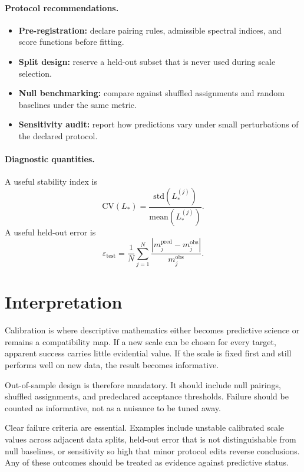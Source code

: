 \documentclass[11pt]{article}
\begin{document}
\paragraph{Protocol recommendations.}
\begin{itemize}[leftmargin=*]
\item \textbf{Pre-registration:} declare pairing rules, admissible spectral indices, and score functions before fitting.
\item \textbf{Split design:} reserve a held-out subset that is never used during scale selection.
\item \textbf{Null benchmarking:} compare against shuffled assignments and random baselines under the same metric.
\item \textbf{Sensitivity audit:} report how predictions vary under small perturbations of the declared protocol.
\end{itemize}

\paragraph{Diagnostic quantities.}
A useful stability index is
\[
\mathrm{CV}(L_*)=\frac{\mathrm{std}(L_*^{(j)})}{\mathrm{mean}(L_*^{(j)})}.
\]
A useful held-out error is
\[
\varepsilon_{\mathrm{test}}=\frac{1}{N}\sum_{j=1}^N\frac{|m_j^{\mathrm{pred}}-m_j^{\mathrm{obs}}|}{m_j^{\mathrm{obs}}}.
\]

\section{Interpretation}
Calibration is where descriptive mathematics either becomes predictive science or remains a compatibility map. If a new scale can be chosen for every target, apparent success carries little evidential value. If the scale is fixed first and still performs well on new data, the result becomes informative.

Out-of-sample design is therefore mandatory. It should include null pairings, shuffled assignments, and predeclared acceptance thresholds. Failure should be counted as informative, not as a nuisance to be tuned away.

Clear failure criteria are essential. Examples include unstable calibrated scale values across adjacent data splits, held-out error that is not distinguishable from null baselines, or sensitivity so high that minor protocol edits reverse conclusions. Any of these outcomes should be treated as evidence against predictive status.
\end{document}
